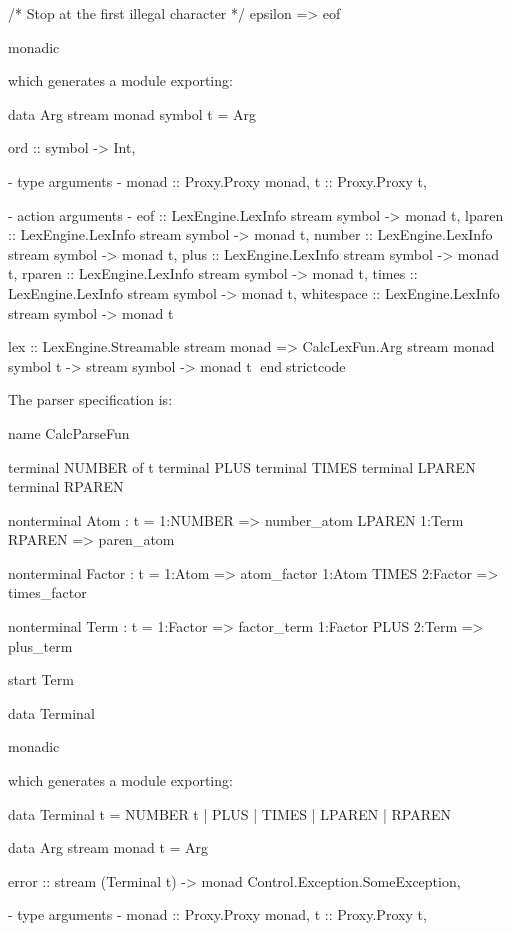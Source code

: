 \documentclass[10pt]{article}
\begin{document}
\begin{strictcode}
\begin{strictcode}
\begin{strictcode}
\begin{strictcode}
\begin{strictcode}
\begin{strictcode}
\begin{strictcode}
\begin{strictcode}
\begin{strictcode}
\begin{bigstrictcode}
\begin{code}
  /* Stop at the first illegal character */
  epsilon => eof

monadic
\end{code}

\noindent
which generates a module exporting:

\begin{strictcode}
data Arg stream monad symbol t =
   Arg { ord :: symbol -> Int,

         {- type arguments -}
         monad :: Proxy.Proxy monad,
         t :: Proxy.Proxy t,

         {- action arguments -}
         eof :: LexEngine.LexInfo stream symbol -> monad t,
         lparen :: LexEngine.LexInfo stream symbol -> monad t,
         number :: LexEngine.LexInfo stream symbol -> monad t,
         plus :: LexEngine.LexInfo stream symbol -> monad t,
         rparen :: LexEngine.LexInfo stream symbol -> monad t,
         times :: LexEngine.LexInfo stream symbol -> monad t,
         whitespace :: LexEngine.LexInfo stream symbol -> monad t }

lex :: LexEngine.Streamable stream monad
       => CalcLexFun.Arg stream monad symbol t -> stream symbol -> monad t
endstrictcode

The parser specification is:

\begin{code}
name CalcParseFun

terminal NUMBER of t
terminal PLUS
terminal TIMES
terminal LPAREN
terminal RPAREN

nonterminal Atom : t =
  1:NUMBER => number_atom
  LPAREN 1:Term RPAREN => paren_atom

nonterminal Factor : t =
  1:Atom => atom_factor
  1:Atom TIMES 2:Factor => times_factor

nonterminal Term : t =
  1:Factor => factor_term
  1:Factor PLUS 2:Term => plus_term

start Term

data Terminal

monadic
\end{code}

\noindent
which generates a module exporting:

\begin{strictcode}
data Terminal t =
   NUMBER t
 | PLUS
 | TIMES
 | LPAREN
 | RPAREN

data Arg stream monad t =
   Arg { error :: stream (Terminal t) -> monad Control.Exception.SomeException,

         {- type arguments -}
         monad :: Proxy.Proxy monad,
         t :: Proxy.Proxy t,

}
\end{strictcode}
\end{strictcode}
\end{bigstrictcode}
\end{strictcode}
\end{strictcode}
\end{strictcode}
\end{strictcode}
\end{strictcode}
\end{strictcode}
\end{strictcode}
\end{strictcode}
\end{strictcode}
\end{document}
